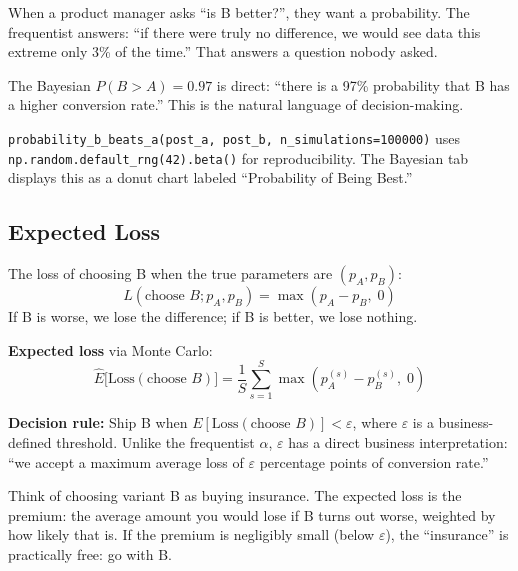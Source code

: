 \documentclass[11pt,a4paper]{article}
\newcommand{\code}[1]{\texttt{#1}}
\newcommand{\numpy}[1]{\texttt{np.#1}}
\begin{document}
\vspace{8pt}

\begin{intuition}
When a product manager asks ``is B better?'', they want a probability. The frequentist answers: ``if there were truly no difference, we would see data this extreme only 3\% of the time.'' That answers a question nobody asked.

The Bayesian $P(B > A) = 0.97$ is direct: ``there is a 97\% probability that B has a higher conversion rate.'' This is the natural language of decision-making.
\end{intuition}

\vspace{8pt}

\begin{application}
\code{probability\_b\_beats\_a(post\_a, post\_b, n\_simulations=100000)} uses \numpy{random.default\_rng(42).beta()} for reproducibility. The Bayesian tab displays this as a donut chart labeled ``Probability of Being Best.''
\end{application}

\subsection{Expected Loss}

\begin{formaldef}
The loss of choosing B when the true parameters are $(p_A, p_B)$:
\[
L(\text{choose } B; p_A, p_B) = \max(p_A - p_B, \; 0)
\]
If B is worse, we lose the difference; if B is better, we lose nothing.

\textbf{Expected loss} via Monte Carlo:
\[
\widehat{E}\bigl[\text{Loss}(\text{choose } B)\bigr] = \frac{1}{S}\sum_{s=1}^{S} \max\!\left(p_A^{(s)} - p_B^{(s)}, \; 0\right)
\]

\textbf{Decision rule:} Ship B when $E[\text{Loss}(\text{choose } B)] < \varepsilon$, where $\varepsilon$ is a business-defined threshold. Unlike the frequentist $\alpha$, $\varepsilon$ has a direct business interpretation: ``we accept a maximum average loss of $\varepsilon$ percentage points of conversion rate.''
\end{formaldef}

\vspace{8pt}

\begin{intuition}
Think of choosing variant B as buying insurance. The expected loss is the premium: the average amount you would lose if B turns out worse, weighted by how likely that is. If the premium is negligibly small (below $\varepsilon$), the ``insurance'' is practically free: go with B.
\end{intuition}
\end{document}
